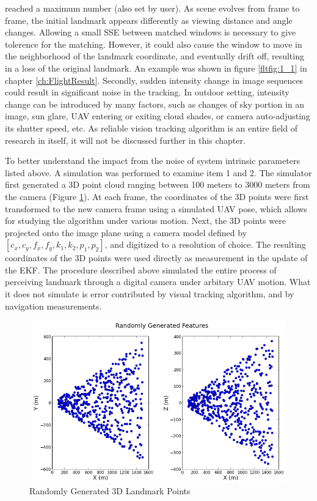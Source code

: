 \begin{enumerate}
  reached a maximum number (also set by user). As scene evolves from
  frame to frame, the initial landmark appears differently as viewing
  distance and angle changes. Allowing a small SSE between matched
  windows is necessary to give tolerence for the matching. However, it
  could also cause the window to move in the neighborhood of the
  landmark coordinate, and eventually drift off, resulting in a loss
  of the original landmark. An example was shown in figure
  \ref{fltfig:1_1} in chapter \ref{ch:FlightResult}. Secondly, sudden
  intensity change in image sequences could result in significant
  noise in the tracking. In outdoor setting, intensity change can be
  introduced by many factors, such as changes of sky portion in an
  image, sun glare, UAV entering or exiting cloud shades, or camera
  auto-adjusting its shutter speed, etc. As reliable vision tracking
  algorithm is an entire field of research in itself, it will not be
  discussed further in this chapter.

\end{enumerate}

To better understand the impact from the noise of system intrinsic
parameters listed above. A simulation was performed to examine item 1
and 2. The simulator first generated a 3D point cloud ranging between
100 meters to 3000 meters from the camera (Figure \ref{fig:simfig51}).
At each frame, the coordinates of the 3D points were first transformed
to the new camera frame using a simulated UAV pose, which allows for
studying the algorithm under various motion. Next, the 3D points were
projected onto the image plane using a camera model defined by
$[c_{x}, c_{y}, f_{x}, f_{y}, k_{1}, k_{2}, p_{1}, p_{2}]$, and
digitized to a resolution of choice. The resulting coordinates of the
3D points were used directly as measurement in the update of the EKF.
The procedure described above simulated the entire process of
perceiving landmark through a digital camera under arbitary UAV
motion. What it does not simulate is error contributed by visual
tracking algorithm, and by navigation measurements.

\begin{figure}[h]
\centering
\includegraphics[width=12cm, height=7cm]{./Figures/SimulationFigures/Figure51.png}
\caption{Randomly Generated 3D Landmark Points}
\label{fig:simfig51}
\end{figure}
\FloatBarrier

